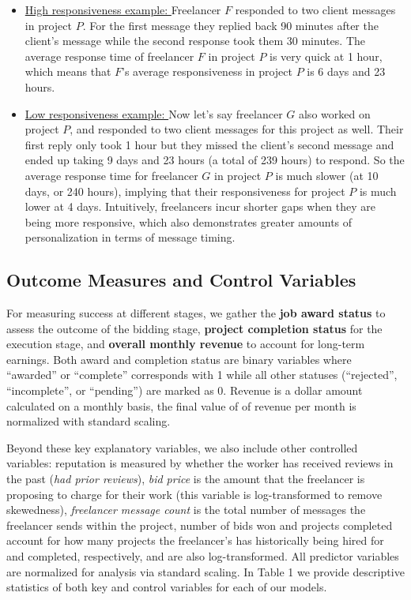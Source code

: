 \begin{itemize}
    \item[\ding{46}] {\underline{High responsiveness example: } Freelancer $F$ responded to two client messages in project $P$. For the first message they replied back 90 minutes after the client's message while the second response took them 30 minutes. The average response time of freelancer $F$ in project $P$ is very quick at 1 hour, which means that $F$'s average responsiveness in project $P$ is 6 days and 23 hours.}
    
    \item[\ding{46}] {\underline{Low responsiveness example: } Now let's say freelancer $G$ also worked on project $P$, and responded to two client messages for this project as well. Their first reply only took 1 hour but they missed the client's second message and ended up taking 9 days and 23 hours (a total of 239 hours) to respond. So the average response time for freelancer $G$ in project $P$ is much slower (at 10 days, or 240 hours), implying that their responsiveness for project $P$ is much lower at 4 days.}{ Intuitively, freelancers incur shorter gaps when they are being more responsive}, which also demonstrates greater amounts of personalization in terms of message timing.
    
\end{itemize}

\subsection{Outcome Measures and Control Variables}

For measuring success at different stages, we gather the \textbf{job award status} to assess the outcome of the bidding stage, \textbf{project completion status} for the execution stage, and \textbf{overall monthly revenue} to account for long-term earnings. Both award and completion status are binary variables where ``awarded'' or ``complete'' corresponds with 1 while all other statuses (``rejected'', ``incomplete'', or ``pending'') are marked as {0}. Revenue is a dollar amount calculated on a monthly basis, the final value of of revenue per month is normalized with standard scaling.

Beyond these key explanatory variables, we also include other controlled variables: {reputation is measured by whether the worker has received reviews in the past (\textit{had prior reviews}), \textit{bid price} is the amount that the freelancer is proposing to charge for their work (this variable is log-transformed to remove skewedness), \textit{freelancer message count} is the total number of messages the freelancer sends within the project, number of bids won and projects completed account for how many projects the freelancer's has historically being hired for and completed, respectively, and are also log-transformed. All predictor variables are normalized for analysis via standard scaling. In Table 1 we provide descriptive statistics of both key and control variables for each of our models.}

